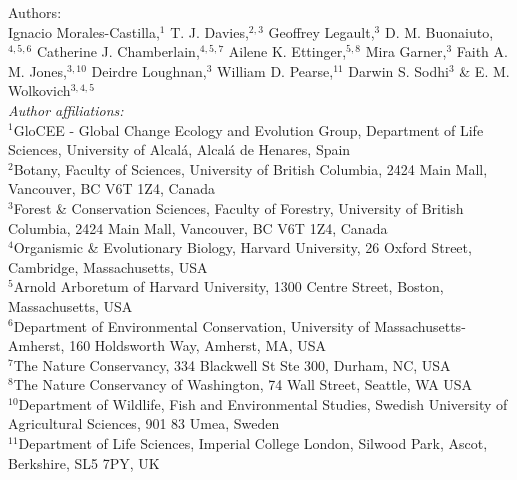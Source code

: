 \documentclass[11pt,a4paper]{letter}
\begin{document}
\begin{letter}{}
\clearpage
\noindent Authors:\\
Ignacio Morales-Castilla,$^{1}$ T. J. Davies,$^{2,3}$ Geoffrey Legault,$^{3}$ D. M. Buonaiuto,$^{4,5,6}$ Catherine J. Chamberlain,$^{4,5,7}$ Ailene K. Ettinger,$^{5,8}$ Mira Garner,$^{3}$ Faith A. M. Jones,$^{3,10}$ Deirdre Loughnan,$^{3}$ William D. Pearse,$^{11}$ Darwin S. Sodhi$^{3}$ \& E. M. Wolkovich$^{3,4,5}$  \vspace{2ex}\\
\emph{Author affiliations:}\\
$^{1}$GloCEE - Global Change Ecology and Evolution Group, Department of Life Sciences, University of Alcal\'a, Alcal\'a de Henares, Spain\\ %
 $^{2}$Botany, Faculty of Sciences, University of British Columbia, 2424 Main Mall, Vancouver, BC V6T 1Z4, Canada\\
$^{3}$Forest \& Conservation Sciences, Faculty of Forestry, University of British Columbia, 2424 Main Mall, Vancouver, BC V6T 1Z4, Canada\\
$^{4}$Organismic \& Evolutionary Biology, Harvard University, 26 Oxford Street, Cambridge, Massachusetts, USA\\
$^{5}$Arnold Arboretum of Harvard University, 1300 Centre Street, Boston, Massachusetts, USA\\
$^{6}$Department of Environmental Conservation, University of Massachusetts-Amherst, 160 Holdsworth Way, Amherst, MA, USA\\  %
 $^{7}$The Nature Conservancy, 334 Blackwell St Ste 300, Durham, NC, USA \\ %
$^{8}$The Nature Conservancy of Washington, 74 Wall Street, Seattle, WA  USA \\ %
$^{10}$Department of Wildlife, Fish and Environmental Studies, Swedish University of Agricultural Sciences, 901 83 Umea, Sweden\\ %
$^{11}$Department of Life Sciences, Imperial College London, Silwood Park, Ascot, Berkshire, SL5 7PY, UK\\



\end{letter}
\end{document}
